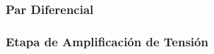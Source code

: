 \subsubsection*{Par Diferencial}


\subsubsection*{Etapa de Amplificación de Tensión}
\medskip




%
%
%
%


\bigskip